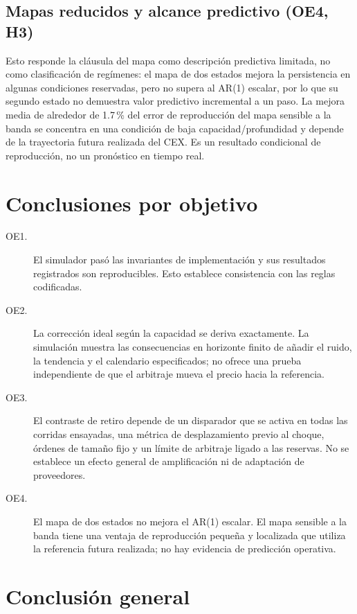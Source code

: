 \subsection{Mapas reducidos y alcance predictivo (OE4, H3)}

Esto responde la cláusula del mapa como descripción predictiva limitada, no como clasificación de regímenes: el mapa de dos estados mejora la persistencia en algunas condiciones reservadas, pero no supera al AR(1) escalar, por lo que su segundo estado no demuestra valor predictivo incremental a un paso. La mejora media de alrededor de 1.7\,\% del error de reproducción del mapa sensible a la banda se concentra en una condición de baja capacidad/profundidad y depende de la trayectoria futura realizada del CEX. Es un resultado condicional de reproducción, no un pronóstico en tiempo real.

\section{Conclusiones por objetivo}

\begin{description}
  \item[OE1.] El simulador pasó las invariantes de implementación y sus resultados registrados son reproducibles. Esto establece consistencia con las reglas codificadas.
  \item[OE2.] La corrección ideal según la capacidad se deriva exactamente. La simulación muestra las consecuencias en horizonte finito de añadir el ruido, la tendencia y el calendario especificados; no ofrece una prueba independiente de que el arbitraje mueva el precio hacia la referencia.
  \item[OE3.] El contraste de retiro depende de un disparador que se activa en todas las corridas ensayadas, una métrica de desplazamiento previo al choque, órdenes de tamaño fijo y un límite de arbitraje ligado a las reservas. No se establece un efecto general de amplificación ni de adaptación de proveedores.
  \item[OE4.] El mapa de dos estados no mejora el AR(1) escalar. El mapa sensible a la banda tiene una ventaja de reproducción pequeña y localizada que utiliza la referencia futura realizada; no hay evidencia de predicción operativa.
\end{description}

\section{Conclusión general}

